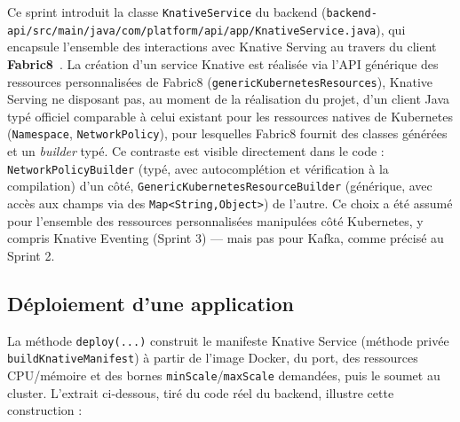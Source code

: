 Ce sprint introduit la classe \texttt{KnativeService} du backend (\texttt{backend-api/src/main/java/com/platform/api/app/KnativeService.java}), qui encapsule l'ensemble des interactions avec Knative Serving au travers du client \textbf{Fabric8}~\citep{Fabric8Doc}. La création d'un service Knative est réalisée via l'API générique des ressources personnalisées de Fabric8 (\texttt{genericKubernetesResources}), Knative Serving ne disposant pas, au moment de la réalisation du projet, d'un client Java typé officiel comparable à celui existant pour les ressources natives de Kubernetes (\texttt{Namespace}, \texttt{NetworkPolicy}), pour lesquelles Fabric8 fournit des classes générées et un \textit{builder} typé. Ce contraste est visible directement dans le code : \texttt{NetworkPolicyBuilder} (typé, avec autocomplétion et vérification à la compilation) d'un côté, \texttt{GenericKubernetesResourceBuilder} (générique, avec accès aux champs via des \texttt{Map<String,Object>}) de l'autre. Ce choix a été assumé pour l'ensemble des ressources personnalisées manipulées côté Kubernetes, y compris Knative Eventing (Sprint 3) — mais pas pour Kafka, comme précisé au Sprint 2.

\subsection{Déploiement d'une application}

La méthode \texttt{deploy(...)} construit le manifeste Knative Service (méthode privée \texttt{buildKnativeManifest}) à partir de l'image Docker, du port, des ressources CPU/mémoire et des bornes \texttt{minScale}/\texttt{maxScale} demandées, puis le soumet au cluster. L'extrait ci-dessous, tiré du code réel du backend, illustre cette construction :

